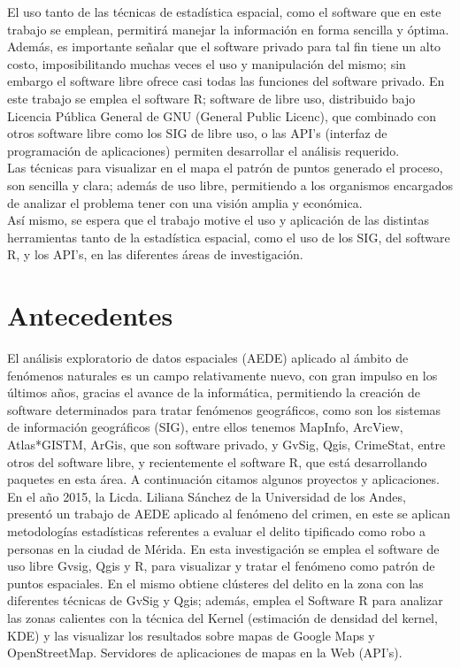 \documentclass[12pt]{report}
\begin{document}
El uso tanto de las técnicas de estadística espacial, como el software que en este trabajo se emplean, permitirá manejar la información en forma sencilla y óptima. Además, es importante señalar que el software privado para tal fin tiene un alto costo, imposibilitando muchas veces el uso y manipulación del mismo; sin embargo el software libre ofrece casi todas las funciones del software privado. En este trabajo se emplea el software R; software de libre uso, distribuido bajo Licencia Pública General de GNU (General Public Licenc), que combinado con otros software libre como los SIG de libre uso, o las API's (interfaz de programación de aplicaciones) permiten desarrollar el análisis requerido.  \\  
     
Las técnicas para visualizar  en el mapa el patrón de puntos generado el proceso, son sencilla y clara; además de uso  libre, permitiendo a los organismos encargados de analizar el problema tener con una visión amplia y económica.\\

Así mismo, se espera que el trabajo motive el uso y aplicación de las distintas herramientas tanto de la estadística espacial, como el uso de los SIG, del software R, y los API's, en las diferentes áreas de investigación. 



	
	\section{Antecedentes }

	

El análisis exploratorio de datos espaciales (AEDE) aplicado al ámbito de fenómenos naturales es un campo relativamente nuevo, con gran impulso en los últimos años,  gracias el avance de la informática, permitiendo la creación de software determinados para tratar fenómenos geográficos, como son los sistemas de información geográficos (SIG), entre ellos tenemos MapInfo, ArcView,  Atlas*GISTM, ArGis, que son software privado, y GvSig, Qgis, CrimeStat, entre otros del software libre, y recientemente el software R, que está desarrollando paquetes en esta área.  A continuación citamos algunos proyectos y aplicaciones.\\

En el año 2015, la Licda. Liliana Sánchez de la Universidad de los Andes, presentó un trabajo de AEDE aplicado al fenómeno del crimen, en este se aplican metodologías estadísticas referentes a evaluar el delito tipificado como robo a personas en la ciudad de Mérida. En esta investigación se emplea el software de uso libre Gvsig, Qgis y R, para visualizar y tratar el fenómeno como patrón de puntos espaciales. En el mismo obtiene clústeres del delito en la zona con las diferentes técnicas de GvSig y Qgis; además, emplea el Software R para analizar las zonas calientes con la técnica del Kernel (estimación de densidad del kernel, KDE) y las visualizar los resultados sobre mapas de Google Maps y OpenStreetMap. Servidores de aplicaciones de mapas en la Web (API's).   \\
\end{document}

